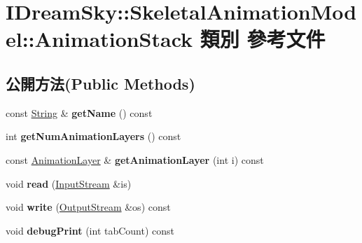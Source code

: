 \hypertarget{class_i_dream_sky_1_1_skeletal_animation_model_1_1_animation_stack}{}\section{I\+Dream\+Sky\+:\+:Skeletal\+Animation\+Model\+:\+:Animation\+Stack 類別 參考文件}
\label{class_i_dream_sky_1_1_skeletal_animation_model_1_1_animation_stack}
\subsection*{公開方法(Public Methods)}
\begin{DoxyCompactItemize}
\item 
const \hyperlink{class_i_dream_sky_1_1_string}{String} \& {\bfseries get\+Name} () const \hypertarget{class_i_dream_sky_1_1_skeletal_animation_model_1_1_animation_stack_ae26cbf6c013227a6a6f8218332c8add7}{}\label{class_i_dream_sky_1_1_skeletal_animation_model_1_1_animation_stack_ae26cbf6c013227a6a6f8218332c8add7}

\item 
int {\bfseries get\+Num\+Animation\+Layers} () const \hypertarget{class_i_dream_sky_1_1_skeletal_animation_model_1_1_animation_stack_a4ee4a2ee785134da1c132e9e776f3e65}{}\label{class_i_dream_sky_1_1_skeletal_animation_model_1_1_animation_stack_a4ee4a2ee785134da1c132e9e776f3e65}

\item 
const \hyperlink{class_i_dream_sky_1_1_skeletal_animation_model_1_1_animation_layer}{Animation\+Layer} \& {\bfseries get\+Animation\+Layer} (int i) const \hypertarget{class_i_dream_sky_1_1_skeletal_animation_model_1_1_animation_stack_a27232b9d25c818a6314797dea36abb68}{}\label{class_i_dream_sky_1_1_skeletal_animation_model_1_1_animation_stack_a27232b9d25c818a6314797dea36abb68}

\item 
void {\bfseries read} (\hyperlink{class_i_dream_sky_1_1_input_stream}{Input\+Stream} \&is)\hypertarget{class_i_dream_sky_1_1_skeletal_animation_model_1_1_animation_stack_a38d71836b5dd3b9f0ee7a28cb027ace1}{}\label{class_i_dream_sky_1_1_skeletal_animation_model_1_1_animation_stack_a38d71836b5dd3b9f0ee7a28cb027ace1}

\item 
void {\bfseries write} (\hyperlink{class_i_dream_sky_1_1_output_stream}{Output\+Stream} \&os) const \hypertarget{class_i_dream_sky_1_1_skeletal_animation_model_1_1_animation_stack_a0145bb92d9c2c6572202d314ac0808ad}{}\label{class_i_dream_sky_1_1_skeletal_animation_model_1_1_animation_stack_a0145bb92d9c2c6572202d314ac0808ad}

\item 
void {\bfseries debug\+Print} (int tab\+Count) const \hypertarget{class_i_dream_sky_1_1_skeletal_animation_model_1_1_animation_stack_aa7bb17456862bf15a52fd706ff0e6e59}{}\label{class_i_dream_sky_1_1_skeletal_animation_model_1_1_animation_stack_aa7bb17456862bf15a52fd706ff0e6e59}

\end{DoxyCompactItemize}
